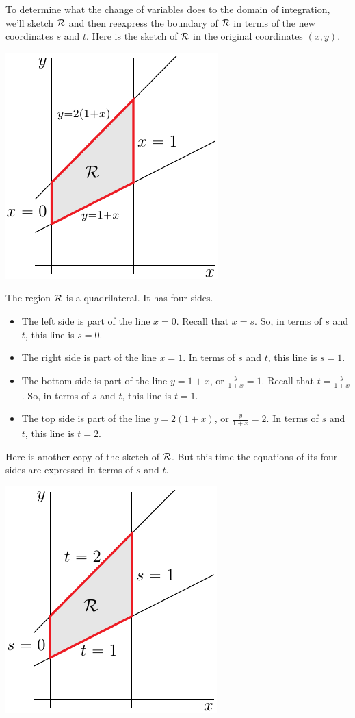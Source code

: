 \begin{eg}
To determine what the change of variables does to the domain of
integration, we'll sketch $\mathcal{R}$ and then reexpress the boundary of $\mathcal{R}$
in terms of the new coordinates $s$ and $t$. Here is the sketch of $\mathcal{R}$ 
in the original coordinates $(x,y)$.
      \begin{efig} 
      \begin{center}
      \includegraphics{genSub.pdf}
      \end{center}
      \end{efig}
The region $\mathcal{R}$ is a quadrilateral. It has four sides.
\begin{itemize}\itemsep1pt \parskip0pt 
\item
The left side is part of the line $x=0$. Recall that $x=s$.
So, in terms of $s$ and $t$, this line is $s=0$.
\item
The right side is part of the line $x=1$. In terms of $s$ and $t$,
this line is $s=1$.
\item
The bottom side is part of the line $y=1+x$, or $\frac{y}{1+x}=1$. 
Recall that $t=\frac{y}{1+x}$. So,
in terms of $s$ and $t$, this line is $t=1$.
\item
The top side is part of the line $y=2(1+x)$, or $\frac{y}{1+x}=2$. 
In terms of $s$ and $t$, this line is $t=2$.
\end{itemize}
Here is another copy of the sketch of $\mathcal{R}$. But this time
the equations of its four sides are expressed in terms of $s$ and $t$.
      \begin{efig} 
      \begin{center}
      \includegraphics{genSubB.pdf}

\end{center}
\end{efig}
\end{eg}
